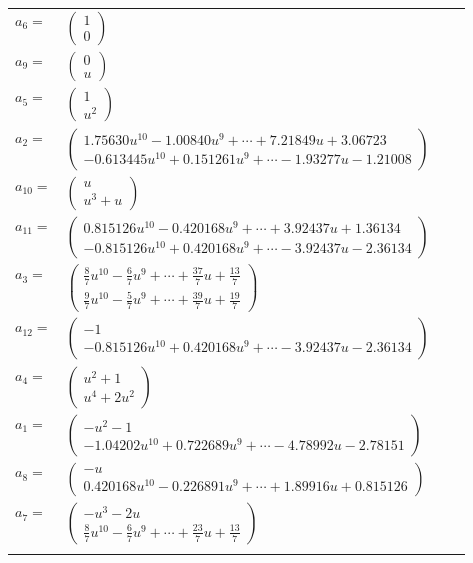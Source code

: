 \documentclass[1p]{elsarticle_modified}
\theoremstyle{definition}
\begin{document}
\begin{tabular}{m{7pt} m{180pt} m{7pt} m{180pt} }
\flushright $a_{6}=$&$\begin{pmatrix}1\\0\end{pmatrix}$ \\
\flushright $a_{9}=$&$\begin{pmatrix}0\\u\end{pmatrix}$ \\
\flushright $a_{5}=$&$\begin{pmatrix}1\\u^2\end{pmatrix}$ \\
\flushright $a_{2}=$&$\begin{pmatrix}1.75630 u^{10}-1.00840 u^{9}+\cdots+7.21849 u+3.06723\\-0.613445 u^{10}+0.151261 u^{9}+\cdots-1.93277 u-1.21008\end{pmatrix}$ \\
\flushright $a_{10}=$&$\begin{pmatrix}u\\u^3+u\end{pmatrix}$ \\
\flushright $a_{11}=$&$\begin{pmatrix}0.815126 u^{10}-0.420168 u^{9}+\cdots+3.92437 u+1.36134\\-0.815126 u^{10}+0.420168 u^{9}+\cdots-3.92437 u-2.36134\end{pmatrix}$ \\
\flushright $a_{3}=$&$\begin{pmatrix}\frac{8}{7} u^{10}-\frac{6}{7} u^9+\cdots+\frac{37}{7} u+\frac{13}{7}\\\frac{9}{7} u^{10}-\frac{5}{7} u^9+\cdots+\frac{39}{7} u+\frac{19}{7}\end{pmatrix}$ \\
\flushright $a_{12}=$&$\begin{pmatrix}-1\\-0.815126 u^{10}+0.420168 u^{9}+\cdots-3.92437 u-2.36134\end{pmatrix}$ \\
\flushright $a_{4}=$&$\begin{pmatrix}u^2+1\\u^4+2 u^2\end{pmatrix}$ \\
\flushright $a_{1}=$&$\begin{pmatrix}- u^2-1\\-1.04202 u^{10}+0.722689 u^{9}+\cdots-4.78992 u-2.78151\end{pmatrix}$ \\
\flushright $a_{8}=$&$\begin{pmatrix}- u\\0.420168 u^{10}-0.226891 u^{9}+\cdots+1.89916 u+0.815126\end{pmatrix}$ \\
\flushright $a_{7}=$&$\begin{pmatrix}- u^3-2 u\\\frac{8}{7} u^{10}-\frac{6}{7} u^9+\cdots+\frac{23}{7} u+\frac{13}{7}\end{pmatrix}$\\&\end{tabular}
\end{document}
